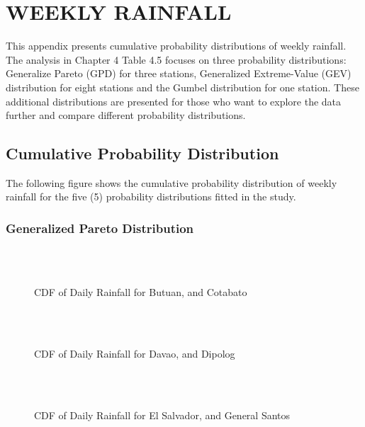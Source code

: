 \chapter{WEEKLY RAINFALL}

This appendix presents cumulative probability distributions of weekly rainfall. The analysis in Chapter 4 Table 4.5 focuses on three probability distributions: Generalize Pareto (GPD) for three stations, Generalized Extreme-Value (GEV) distribution for eight stations and the Gumbel distribution for one station. These additional distributions are presented for those who want to explore the data further and compare different probability distributions.


\section{Cumulative Probability Distribution}

The following figure shows the cumulative probability distribution of weekly rainfall for the five (5) probability distributions fitted in the study.

\subsection{Generalized Pareto Distribution}

\begin{figure}[H]
  \centering
  \\
  \\
  \caption{CDF of Daily Rainfall for Butuan, and Cotabato}
  \label{fig:weekly_without_threshold_appendix_gpd_pt1}
\end{figure}

\begin{figure}[H]
  \centering
  \\
  \\
  \caption{CDF of Daily Rainfall for Davao, and Dipolog}
  \label{fig:weekly_without_threshold_appendix_gpd_pt2}
\end{figure}

\begin{figure}[H]
  \centering
  \\
  \\
  \caption{CDF of Daily Rainfall for El Salvador, and General Santos}
  \label{fig:weekly_without_threshold_appendix_gpd_pt3}
\end{figure}

